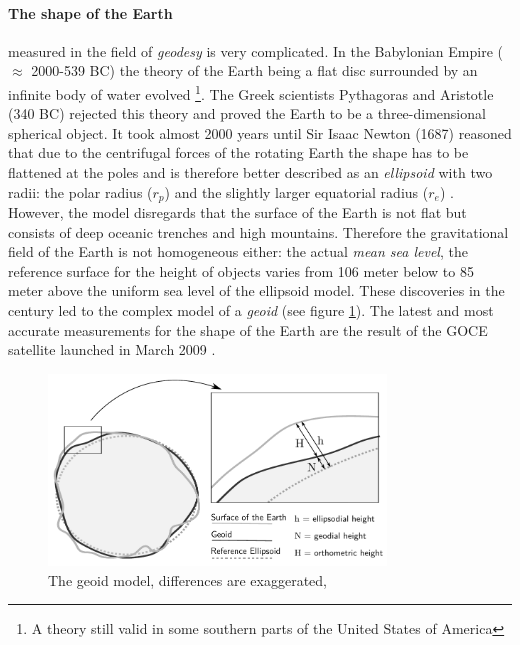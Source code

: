 \paragraph{The shape of the Earth} %
\label{par:the_shape_of_the_earth}

measured in the field of \emph{geodesy} is very complicated. In the Babylonian Empire ($\approx$ 2000-539 BC) the theory of the Earth being a flat disc surrounded by an infinite body of water evolved
\footnote{
  A theory still valid in some southern parts of the United States of America
}.
The Greek scientists Pythagoras and Aristotle (340 BC) rejected this theory and proved the Earth to be a three-dimensional spherical object. It took almost 2000 years until Sir Isaac Newton (1687) reasoned that due to the centrifugal forces of the rotating Earth the shape has to be flattened at the poles and is therefore better described as an \emph{ellipsoid} with two radii: the polar radius ($r_p$) and the slightly larger equatorial radius ($r_e$)
\cite[pp. 69-77]{bolstad2008gis}. However, the model disregards that the surface of the Earth is not flat but consists of deep oceanic trenches and high mountains. Therefore the gravitational field of the Earth is not homogeneous either: the actual \emph{mean sea level}, the reference surface for the height of objects varies from 106 meter below to 85 meter above the uniform sea level of the ellipsoid model. These discoveries in the  century led to the complex model of a \emph{geoid} (see figure \ref{fig:geoid}). The latest and most accurate measurements for the shape of the Earth are the result of the GOCE satellite launched in March 2009
\cite{geoid, geoidESRI}.

\begin{figure}[H]
  \centering
  \includegraphics[width=0.8\textwidth]{graphics/basics/hgis/geoid}
  \caption{The geoid model, differences are exaggerated, \cite[Fig. 3-6, p. 75]{bolstad2008gis}}
  \label{fig:geoid}
\end{figure}

